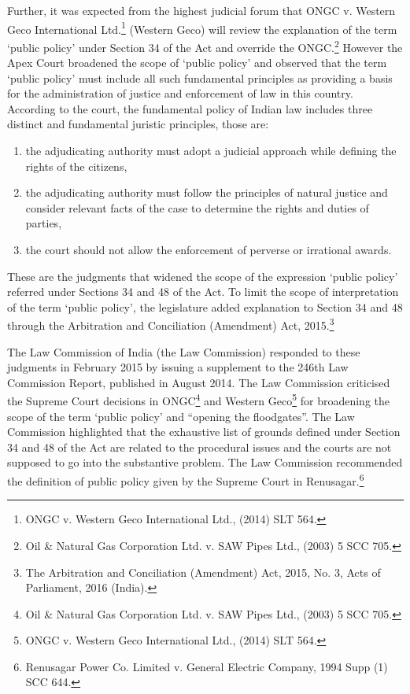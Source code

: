 \begin{multicols}{2}
\noi
Further, it was expected from the highest judicial forum that ONGC v. Western Geco
International Ltd.\footnote{ONGC v. Western Geco International Ltd., (2014) SLT 564.} (Western Geco) will review the explanation of the term ‘public policy’
under Section 34 of the Act and override the ONGC.\footnote{Oil \& Natural Gas Corporation Ltd. v. SAW Pipes Ltd., (2003) 5 SCC 705.} However the Apex Court broadened
the scope of ‘public policy’ and observed that the term ‘public policy’ must include all such
fundamental principles as providing a basis for the administration of justice and enforcement
of law in this country. According to the court, the fundamental policy of Indian law includes
three distinct and fundamental juristic principles, those are:

\begin{enumerate}[label=$\alph*)$]
\item the adjudicating authority must adopt a judicial approach while defining the rights of the citizens,

\item the adjudicating authority must follow the principles of natural justice and consider relevant facts of the case to determine the rights and duties of parties,

\item the court should not allow the enforcement of perverse or irrational awards.
\end{enumerate}

\noi
These are the judgments that widened the scope of the expression ‘public policy’ referred
under Sections 34 and 48 of the Act. To limit the scope of interpretation of the term ‘public
policy’, the legislature added explanation to Section 34 and 48 through the Arbitration and
Conciliation (Amendment) Act, 2015.\footnote{The Arbitration and Conciliation (Amendment) Act, 2015, No. 3, Acts of Parliament, 2016 (India).}


\noi
The Law Commission of India (the Law Commission) responded to these judgments in
February 2015 by issuing a supplement to the 246th Law Commission Report, published in
August 2014. The Law Commission criticised the Supreme Court decisions in ONGC\footnote{Oil \& Natural Gas Corporation Ltd. v. SAW Pipes Ltd., (2003) 5 SCC 705.} and
Western Geco\footnote{ONGC v. Western Geco International Ltd., (2014) SLT 564.} for broadening the scope of the term ‘public policy’ and “opening the floodgates”. The Law Commission highlighted that the exhaustive list of grounds defined
under Section 34 and 48 of the Act are related to the procedural issues and the courts are not
supposed to go into the substantive problem. The Law Commission recommended the
definition of public policy given by the Supreme Court in Renusagar.\footnote{Renusagar Power Co. Limited v. General Electric Company, 1994 Supp (1) SCC 644.}


\end{multicols}
